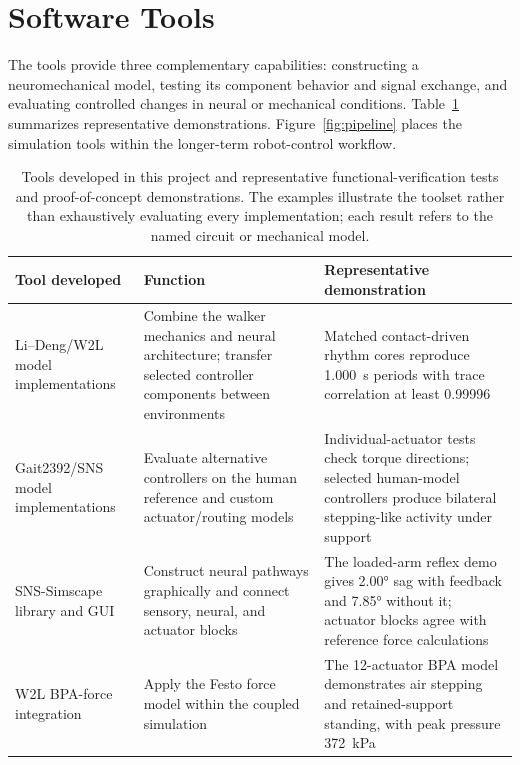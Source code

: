 \section{Software Tools}\label{sec:preliminary_sim_methods}

The tools provide three complementary capabilities: constructing a neuromechanical model, testing its component behavior and signal exchange, and evaluating controlled changes in neural or mechanical conditions. Table~\ref{tab:sns_capability} summarizes representative demonstrations. Figure~\ref{fig:pipeline} places the simulation tools within the longer-term robot-control workflow.

\begin{table}[htbp]
\caption[Tools developed and representative demonstrations]{Tools developed in this project and representative functional-verification tests and proof-of-concept demonstrations. The examples illustrate the toolset rather than exhaustively evaluating every implementation; each result refers to the named circuit or mechanical model.}
\label{tab:sns_capability}
\small
\begin{tabularx}{\textwidth}{@{}>{\raggedright\arraybackslash}p{}*{2}{>{\raggedright\arraybackslash}X}@{}}
\toprule
\textbf{Tool developed} & \textbf{Function} & \textbf{Representative demonstration} \\
\midrule
Li--Deng/W2L model implementations & Combine the walker mechanics and neural architecture; transfer selected controller components between environments & Matched contact-driven rhythm cores reproduce \qty{1.000}{\second} periods with trace correlation at least 0.99996 \\
Gait2392/SNS model implementations & Evaluate alternative controllers on the human reference and custom actuator/routing models & Individual-actuator tests check torque directions; selected human-model controllers produce bilateral stepping-like activity under support \\
SNS-Simscape library and GUI & Construct neural pathways graphically and connect sensory, neural, and actuator blocks & The loaded-arm reflex demo gives \ang{2.00} sag with feedback and \ang{7.85} without it; actuator blocks agree with reference force calculations \\
W2L BPA-force integration & Apply the Festo force model within the coupled simulation & The 12-actuator BPA model demonstrates air stepping and retained-support standing, with peak pressure \qty{372}{\kPa} \\

\end{tabularx}
\end{table}
